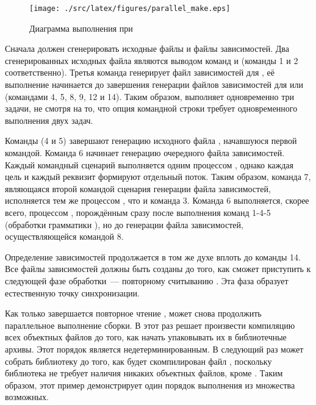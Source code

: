 \begin{figure}
\begin{center}
\texttt{[image: ./src/latex/figures/parallel\_make.eps]}
\end{center}
\caption{Диаграмма выполнения \GNUmake{} при }
\label{fig:parallel_make}
\end{figure}

Сначала \GNUmake{} должен сгенерировать исходные файлы и файлы
зависимостей. Два сгенерированных исходных файла являются выводом
команд  и  (команды 1 и 2
соответственно). Третья команда генерирует файл зависимостей для
, её выполнение начинается до завершения
генерации файлов зависимостей для  или
 (командами 4, 5, 8, 9, 12 и 14). Таким образом,
\GNUmake{} выполняет одновременно три задачи, не смотря на то, что
опция командной строки требует одновременного выполнения двух задач.

Команды  (4 и 5) завершают генерацию исходного файла
, начавшуюся первой командой. Команда 6 начинает
генерацию очередного файла зависимостей. Каждый командный сценарий
выполняется одним процессом \GNUmake{}, однако каждая цель и каждый
реквизит формируют отдельный поток. Таким образом, команда 7,
являющаяся второй командой сценария генерации файла зависимостей,
исполняется тем же процессом \GNUmake{}, что и команда 3. Команда 6
выполняется, скорее всего, процессом \GNUmake{}, порождённым сразу
после выполнения команд 1-4-5 (обработки грамматики ),
но до генерации файла зависимостей, осуществляющейся командой 8.

Определение зависимостей продолжается в том же духе вплоть до команды
14. Все файлы зависимостей должны быть созданы до того, как \GNUmake{}
сможет приступить к следующей фазе обработки~--- повторному считыванию
. Эта фаза образует естественную точку синхронизации.

Как только завершается повторное чтение , \GNUmake{} может
снова продолжить параллельное выполнение сборки. В этот раз \GNUmake{}
решает произвести компиляцию всех объектных файлов до того, как начать
упаковывать их в библиотечные архивы. Этот порядок является
недетерминированным. В следующий раз \GNUmake{} может собрать
библиотеку  до того, как будет скомпилирован файл
, поскольку библиотека не требует наличия никаких
объектных файлов, кроме . Таким образом, этот пример
демонстрирует один порядок выполнения из множества возможных.

